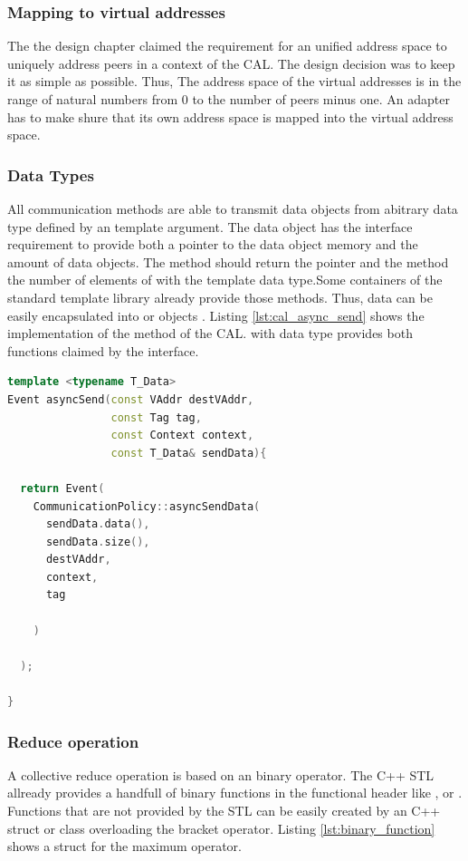 \subsubsection{Mapping to virtual addresses}
The the design chapter claimed the requirement for an unified address
space to uniquely address peers in a context of the CAL. The design decision
was to keep it as simple as possible. Thus, The address space of the
virtual addresses is in the range of natural numbers from 0 to the number
of peers minus one. An adapter has to make shure that its own address
space is mapped into the virtual address space.

\subsubsection{Data Types}
All communication methods are able to transmit data objects from
abitrary data type defined by an template argument. The data object
has the interface requirement to provide both a pointer to the data
object memory and the amount of data objects. The method 
should return the pointer and the method  the number of
elements of with the template data type.Some containers of the
standard template library already provide those methods. Thus, data
can be easily encapsulated into  or 
objects \cite{ref:vector, ref:array}. Listing \ref{lst:cal_async_send}
shows the implementation of the  method of the CAL.
 with data type  provides both functions
claimed by the interface.

\begin{lstlisting}[language=C++, breaklines=false, label={lst:cal_async_send}]
template <typename T_Data>
Event asyncSend(const VAddr destVAddr, 
                const Tag tag, 
                const Context context, 
                const T_Data& sendData){

  return Event(
    CommunicationPolicy::asyncSendData(
      sendData.data(),
      sendData.size(), 
      destVAddr, 
      context, 
      tag
      
    )
      
  );

}
\end{lstlisting}

\subsubsection{Reduce operation}
A collective reduce operation is based on an binary operator. The C++
STL allready provides a handfull of binary functions in the functional
header like ,  or 
\cite{ref:functional}. Functions that are not provided by the STL can
be easily created by an C++ struct or class overloading the bracket
operator. Listing \ref{lst:binary_function} shows a struct for
the maximum operator.

